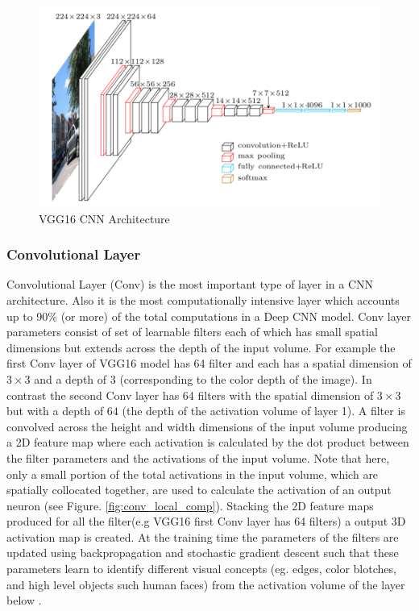 \documentclass[10, sigconf]{acmart}
\begin{document}
\begin{figure}
  \includegraphics[width=\columnwidth]{./images/vgg16}
  \caption{VGG16 CNN Architecture}
  \label{fig:vgg16}
\end{figure}

\subsubsection{Convolutional Layer}
Convolutional Layer (Conv) is the most important type of layer in a CNN architecture. Also it is the most computationally intensive layer which accounts up to 90\% (or more) of the total computations in a Deep CNN model.
Conv layer parameters consist of set of learnable filters each of which has small spatial dimensions but extends across the depth of the input volume.
For example the first Conv layer of VGG16 model has 64 filter and each has a spatial dimension of $3\times3$ and a depth of $3$ (corresponding to the color depth of the image). In contrast the second Conv layer has 64 filters with the spatial dimension of $3\times3$ but with a depth of $64$ (the depth of the activation volume of layer 1).
A filter is convolved across the height and width dimensions of the input volume producing a 2D feature map where each activation is calculated by the dot product between the filter parameters and the activations of the input volume.
Note that here, only a small portion of the total activations in the input volume, which are spatially collocated together, are used to calculate the activation of an output neuron (see Figure. \ref{fig:conv_local_comp}).
Stacking the 2D feature maps produced for all the filter(e.g VGG16 first Conv layer has 64 filters) a output 3D activation map is created.
At the training time the parameters of the filters are updated using backpropagation and stochastic gradient descent such that these parameters learn to identify different visual concepts (eg. edges, color blotches, and high level objects such human faces) from the activation volume of the layer below \cite{zeiler2014visualizing}.
\end{document}
